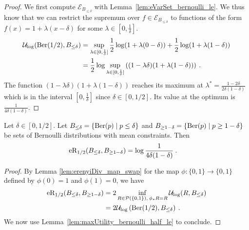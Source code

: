 \begin{proof}\leanok
We first compute $\mathcal{E}_{B_{\le \delta}}$ with Lemma~\ref{lem:eVarSet_bernoulli_le}.
We thus know that we can restrict the supremum over $f \in \mathcal{E}_{B_{\le \delta}}$ to functions of the form $f(x) = 1 + \lambda (x - \delta)$ for some $\lambda \in [0, \frac{1}{\delta}]$.
\begin{align*}
  \mathcal{U}_{\log}(\operatorname{Ber}(1/2), B_{\le \delta})
  &= \sup_{\lambda \in [0, \frac{1}{\delta}]} \frac{1}{2} \log (1 + \lambda (0 - \delta)) + \frac{1}{2} \log (1 + \lambda (1 - \delta))
  \\
  &= \frac{1}{2} \log \sup_{\lambda \in [0, \frac{1}{\delta}]} \left((1 - \lambda \delta)(1 + \lambda (1 - \delta))\right)
  \: .
\end{align*}
The function $(1 - \lambda \delta)(1 + \lambda (1 - \delta))$ reaches its maximum at $\lambda^* = \frac{1 - 2\delta}{2\delta (1 - \delta)}$ which is in the interval $[0, \frac{1}{\delta}]$ since $\delta \in [0,1/2]$.
Its value at the optimum is $\frac{1}{4 \delta (1 - \delta)}$.
\end{proof}


\begin{lemma}\label{lem:erenyiDiv_bernoulli}
  \leanok
Let $\delta \in [0,1/2]$.
Let $B_{\le \delta} = \{\operatorname{Ber}(p) \mid p \le \delta\}$ and $B_{\ge 1 - \delta} = \{\operatorname{Ber}(p) \mid p \ge 1 - \delta\}$ be sets of Bernoulli distributions with mean constraints.
Then
\begin{align*}
  \operatorname{eR}_{1/2}(B_{\le \delta}, B_{\ge 1 - \delta})
  &= \log \frac{1}{4 \delta (1 - \delta)}
  \: .
\end{align*}
\end{lemma}

\begin{proof}\leanok
By Lemma \ref{lem:erenyiDiv_map_swap} for the map $\phi : \{0,1\} \to \{0,1\}$ defined by $\phi(0) = 1$ and $\phi(1) = 0$, we have
\begin{align*}
  \operatorname{eR}_{1/2}(B_{\le \delta}, B_{\ge 1 - \delta})
  &= 2 \inf_{R \in \mathcal{P}(\{0,1\}), \: \phi_* R = R} \mathcal{U}_{\log}(R, B_{\le \delta})
  \\
  &= 2 \mathcal{U}_{\log}\left(\operatorname{Ber}(1/2), B_{\le \delta}\right)
  \: .
\end{align*}
We now use Lemma~\ref{lem:maxUtility_bernoulli_half_le} to conclude.
\end{proof}


